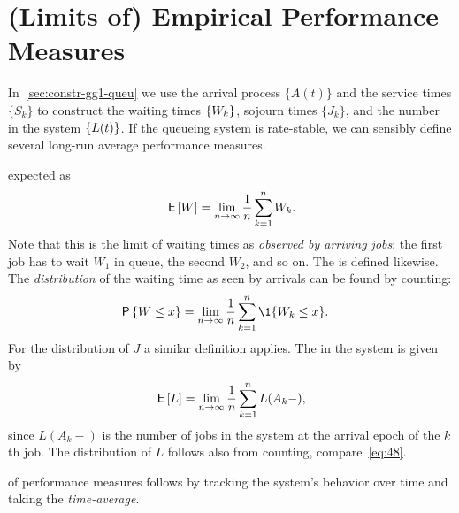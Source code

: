 
\section{(Limits of) Empirical Performance Measures}
\label{sec:limits-of-empirical}

In~\cref{sec:constr-gg1-queu} we use the arrival process $\{A(t)\}$ and the service times $\{S_k\}$ to construct the waiting times $\{W_k\}$, sojourn times $\{J_k\}$, and the number in the system $\{L(t)\}$. If the queueing system is rate-stable, we can sensibly define several long-run average performance measures.




 expected  as
\begin{equation*}
 \,\mathsf{E}\left[W\right] = \lim_{n\to\infty} \frac 1 n\sum_{k=1}^n W_{k}.
\end{equation*}
Note that this is the limit of waiting times as \emph{observed by arriving jobs}:
 the first job has to wait $W_1$ in queue, the second $W_2$, and so on.
The  is defined likewise.
The \emph{distribution} of the waiting time as seen by arrivals can be found by counting:
\begin{align}\label{eq:48}
 \P{\W \leq x} &= \lim_{n\to\infty} \frac 1n\sum_{k=1}^n \1{\W_k\leq x}.
\end{align}
For the distribution of $J$  a similar definition applies.
The  in the system is given by
\begin{equation}\label{eq:EQ}
\,\mathsf{E}\left[L\right] = \lim_{n\to\infty}\frac 1 n \sum_{k=1}^n L(A_k-),
\end{equation}
since $L(A_k-)$ is the number of jobs in the system at the arrival epoch of the $k$th job.
The distribution of $L$ follows also from counting, compare~\cref{eq:48}.


 of performance measures follows by tracking the system's behavior over time and taking the \emph{time-average}.

